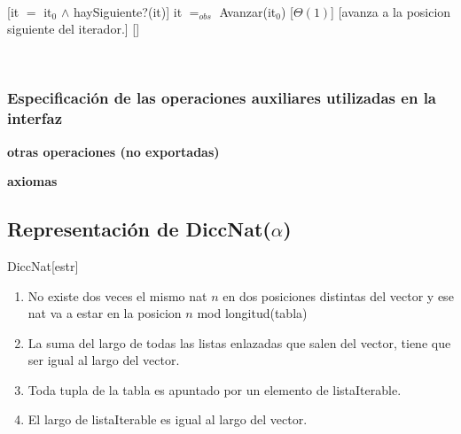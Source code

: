 ~

[it $=$ it$_0$ $\land$ haySiguiente?(it)]
{it $=_{obs}$ Avanzar(it$_0$)}
[$\Theta(1)$]
[avanza a la posicion siguiente del iterador.]
[]

~

\subsubsection{Especificación de las operaciones auxiliares utilizadas en la interfaz}

\begin{tad}{}
	\textbf{otras operaciones (no exportadas)}


	\textbf{axiomas}

\end{tad}

\pagebreak

\subsection{Representación de DiccNat($\alpha$)}

\begin{Estructura}{DiccNat}[estr]
	\begin{Tupla}[estr]
	\end{Tupla}
\end{Estructura}

\begin{enumerate}
	\item No existe dos veces el mismo nat $n$ en dos posiciones distintas del vector y ese nat va a estar en la posicion $n$ mod longitud(tabla)
	\item La suma del largo de todas las listas enlazadas que salen del vector, tiene que ser igual al largo del vector.
	\item Toda tupla de la tabla es apuntado por un elemento de listaIterable.
	\item El largo de listaIterable es igual al largo del vector.
\end{enumerate}

